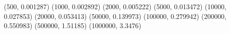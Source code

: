 (500, 0.001287) (1000, 0.002892) (2000, 0.005222) (5000, 0.013472) (10000, 0.027853) (20000, 0.053413) (50000, 0.139973) (100000, 0.279942) (200000, 0.550983) (500000, 1.51185) (1000000, 3.3476) 